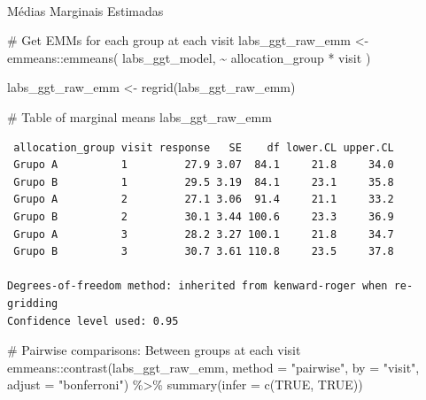 \documentclass[
  letterpaper,
  DIV=11,
  numbers=noendperiod]{scrartcl}
\makeatletter
\let\oldparagraph\paragraph
\renewcommand{\paragraph}{
    \@ifstar
      \xxxParagraphStar
      \xxxParagraphNoStar
  }
\newcommand{\xxxParagraphStar}[1]{\oldparagraph*{#1}\mbox{}}
\newcommand{\xxxParagraphNoStar}[1]{\oldparagraph{#1}\mbox{}}
\newenvironment{Shaded}{\begin{snugshade}}{\end{snugshade}}
\newcommand{\AttributeTok}[1]{\textcolor[rgb]{0.40,0.45,0.13}{#1}}
\newcommand{\CommentTok}[1]{\textcolor[rgb]{0.37,0.37,0.37}{#1}}
\newcommand{\ConstantTok}[1]{\textcolor[rgb]{0.56,0.35,0.01}{#1}}
\newcommand{\FunctionTok}[1]{\textcolor[rgb]{0.28,0.35,0.67}{#1}}
\newcommand{\NormalTok}[1]{\textcolor[rgb]{0.00,0.23,0.31}{#1}}
\newcommand{\OtherTok}[1]{\textcolor[rgb]{0.00,0.23,0.31}{#1}}
\newcommand{\SpecialCharTok}[1]{\textcolor[rgb]{0.37,0.37,0.37}{#1}}
\newcommand{\StringTok}[1]{\textcolor[rgb]{0.13,0.47,0.30}{#1}}
\makeatother
\begin{document}
\paragraph{Médias Marginais
Estimadas}\label{muxe9dias-marginais-estimadas-2}

\begin{Shaded}
\begin{Highlighting}[]
\CommentTok{\# Get EMMs for each group at each visit}
\NormalTok{labs\_ggt\_raw\_emm }\OtherTok{\textless{}{-}}\NormalTok{ emmeans}\SpecialCharTok{::}\FunctionTok{emmeans}\NormalTok{(}
\NormalTok{    labs\_ggt\_model, }
    \SpecialCharTok{\textasciitilde{}}\NormalTok{ allocation\_group }\SpecialCharTok{*}\NormalTok{ visit}
\NormalTok{)}

\NormalTok{labs\_ggt\_raw\_emm }\OtherTok{\textless{}{-}} \FunctionTok{regrid}\NormalTok{(labs\_ggt\_raw\_emm)}

\CommentTok{\# Table of marginal means}
\NormalTok{labs\_ggt\_raw\_emm}
\end{Highlighting}
\end{Shaded}

\begin{verbatim}
 allocation_group visit response   SE    df lower.CL upper.CL
 Grupo A          1         27.9 3.07  84.1     21.8     34.0
 Grupo B          1         29.5 3.19  84.1     23.1     35.8
 Grupo A          2         27.1 3.06  91.4     21.1     33.2
 Grupo B          2         30.1 3.44 100.6     23.3     36.9
 Grupo A          3         28.2 3.27 100.1     21.8     34.7
 Grupo B          3         30.7 3.61 110.8     23.5     37.8

Degrees-of-freedom method: inherited from kenward-roger when re-gridding 
Confidence level used: 0.95 
\end{verbatim}

\begin{Shaded}
\begin{Highlighting}[]
\CommentTok{\# Pairwise comparisons: Between groups at each visit}
\NormalTok{emmeans}\SpecialCharTok{::}\FunctionTok{contrast}\NormalTok{(labs\_ggt\_raw\_emm, }\AttributeTok{method =} \StringTok{"pairwise"}\NormalTok{, }\AttributeTok{by =} \StringTok{"visit"}\NormalTok{, }\AttributeTok{adjust =} \StringTok{"bonferroni"}\NormalTok{) }\SpecialCharTok{\%\textgreater{}\%} \FunctionTok{summary}\NormalTok{(}\AttributeTok{infer =} \FunctionTok{c}\NormalTok{(}\ConstantTok{TRUE}\NormalTok{, }\ConstantTok{TRUE}\NormalTok{))}
\end{Highlighting}
\end{Shaded}
\end{document}
